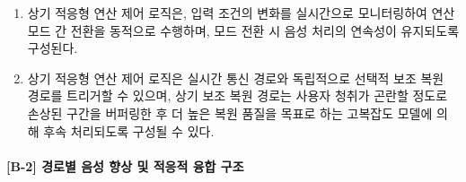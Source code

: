 \documentclass{article}
\begin{document}
\begin{enumerate}[label = \textbf{(B.1.\arabic*)}]
\begin{itemize}
        \item \textbf{제2 모드(고성능 AI 모드):} 포화 마스크가 활성 상태(활성 비율 10\% 이상)이거나 외부 소음도가 상기 제1 임계치 이상인 경우, 보다 큰 문맥 또는 복잡한 특징 표현을 활용하는 고성능 딥러닝 기반 음성 향상 모델을 활성화하여 연산 자원을 집중 할당한다. 이때, 포화 마스크의 활성 비율이 소정 기준을 초과하는 경우, 상기 음성 향상 모델은 골전도 우세 복원 모드로 전환될 수 있다.
    \end{itemize}

    상기 외부 소음도는 공기전도 마이크로폰 채널의 단시간 RMS 또는 등가 음압 레벨(Leq)에 기초하여 산출될 수 있으며, 공기전도 채널 포화 시에는 포화 마스크 활성 비율 또는 별도 음압 센서의 측정값을 보조 지표로 활용할 수 있다. 또한, 제0 모드 선택을 위해 스펙트럼 변동량(spectral flux), 프레임 간 분산, 임펄시브니스(impulsiveness), 및 DSP 처리 후 잔여 오차에 대응하는 품질 지표와 같은 저복잡도 특성량이 추가로 사용될 수 있다.

    상기 모드 전환에는 채터링 방지를 위한 히스테리시스가 적용되며, 일 실시예에서 제2 모드에서 제1 모드로의 복귀 시 외부 소음도 기준을 110\,dB\,SPL 미만, 포화 마스크 활성 비율을 5\% 미만으로 설정한다. 상기 각 임계값은 운용 환경에 따라 조정 가능한 설계 파라미터이며, 구체적인 상태 전이 조건 및 전환 절차는 후술하는 적응형 연산 제어 실시예에서 상세히 기술한다.

    \item 상기 적응형 연산 제어 로직은, 입력 조건의 변화를 실시간으로
    모니터링하여 연산 모드 간 전환을 동적으로 수행하며, 모드 전환 시
    음성 처리의 연속성이 유지되도록 구성된다.

    \item 상기 적응형 연산 제어 로직은 실시간 통신 경로와 독립적으로 선택적 보조 복원 경로를 트리거할 수 있으며, 상기 보조 복원 경로는 사용자 청취가 곤란할 정도로 손상된 구간을 버퍼링한 후 더 높은 복원 품질을 목표로 하는 고복잡도 모델에 의해 후속 처리되도록 구성될 수 있다.

\end{enumerate}


\paragraph{[B-2] 경로별 음성 향상 및 적응적 융합 구조}
\end{document}
